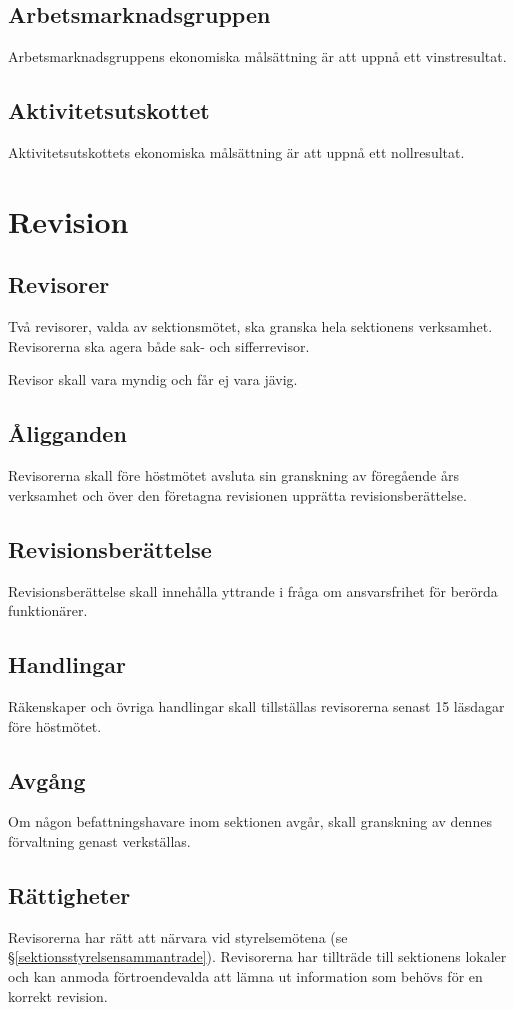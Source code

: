 \documentclass{datateknologsektionen-document}
\begin{document}
    \subsection{Arbetsmarknadsgruppen}
      Arbetsmarknadsgruppens ekonomiska målsättning är att uppnå ett vinstresultat.
    \subsection{Aktivitetsutskottet}
      Aktivitetsutskottets ekonomiska målsättning är att uppnå ett nollresultat.

  \section{Revision}
    \subsection{Revisorer}
      Två revisorer, valda av sektionsmötet, ska granska hela sektionens verksamhet.
      Revisorerna ska agera både sak- och sifferrevisor.

      Revisor skall vara myndig och får ej vara jävig.
    \subsection{Åligganden}
      Revisorerna skall före höstmötet avsluta sin granskning av föregående års verksamhet
      och över den företagna revisionen upprätta revisionsberättelse.
    \subsection{Revisionsberättelse}
      Revisionsberättelse skall innehålla yttrande i fråga om ansvarsfrihet för berörda
      funktionärer.
    \subsection{Handlingar}
      Räkenskaper och övriga handlingar skall tillställas revisorerna senast 15 läsdagar före
      höstmötet.
    \subsection{Avgång}
      Om någon befattningshavare inom sektionen avgår, skall granskning av dennes
      förvaltning genast verkställas.
    \subsection{Rättigheter}
      Revisorerna har rätt att närvara vid styrelsemötena (se \S \ref{sektionsstyrelsensammantrade}). Revisorerna har tillträde till
      sektionens lokaler och kan anmoda förtroendevalda att lämna ut information som
      behövs för en korrekt revision.
\end{document}
